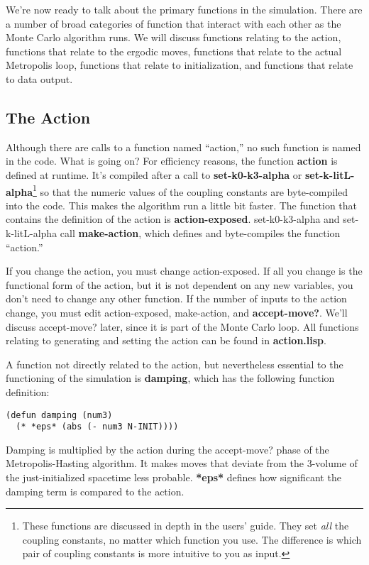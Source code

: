 \documentclass[12pt]{article}
\begin{document}
We're now ready to talk about the primary functions in the
simulation. There are a number of broad categories of function that
interact with each other as the Monte Carlo algorithm runs. We will
discuss functions relating to the action, functions that relate to the
ergodic moves, functions that relate to the actual Metropolis loop,
functions that relate to initialization, and functions that relate to
data output.

\subsection{The Action}

Although there are calls to a function named ``action,'' no such
function is named in the code. What is going on? For efficiency
reasons, the function \textbf{action} is defined at runtime. It's
compiled after a call to \textbf{set-k0-k3-alpha} or
\textbf{set-k-litL-alpha}\footnote{These functions are discussed in
  depth in the users' guide. They set \textit{all} the coupling
  constants, no matter which function you use. The difference is which
  pair of coupling constants is more intuitive to you as input.} so
that the numeric values of the coupling constants are byte-compiled
into the code. This makes the algorithm run a little bit faster. The
function that contains the definition of the action is
\textbf{action-exposed}. set-k0-k3-alpha and set-k-litL-alpha call
\textbf{make-action}, which defines and byte-compiles the function
``action.''

If you change the action, you must change action-exposed. If all you
change is the functional form of the action, but it is not dependent
on any new variables, you don't need to change any other function. If
the number of inputs to the action change, you must edit
action-exposed, make-action, and \textbf{accept-move?}. We'll discuss
accept-move? later, since it is part of the Monte Carlo loop. All
functions relating to generating and setting the action can be found
in \textbf{action.lisp}.

A function not directly related to the action, but nevertheless
essential to the functioning of the simulation is \textbf{damping},
which has the following function definition:
\begin{lstlisting}
(defun damping (num3)
  (* *eps* (abs (- num3 N-INIT))))
\end{lstlisting}
Damping is multiplied by the action during the accept-move? phase of
the Metropolis-Hasting algorithm. It makes moves that deviate from the
3-volume of the just-initialized spacetime less
probable. \textbf{*eps*} defines how significant the damping term is
compared to the action.
\end{document}
